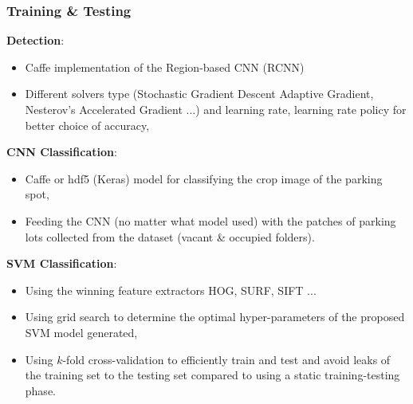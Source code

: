 \documentclass{beamer}
\begin{document}
\begin{frame}[allowframebreaks]
\frametitle{Training \& Testing} 

\textbf{Detection}: 
\begin{itemize}
\item Caffe implementation of the Region-based CNN (RCNN) 
\item Different solvers type (Stochastic Gradient Descent Adaptive Gradient, Nesterov’s Accelerated Gradient ...) and learning rate, learning rate policy for better choice of accuracy,
\end{itemize}
\textbf{CNN Classification}:
\begin{itemize}
	\item Caffe or hdf5 (Keras) model for classifying the crop image of the parking spot,
	\item Feeding the CNN (no matter what model used) with the patches of parking lots collected from the dataset (vacant \& occupied folders).
\end{itemize}
\textbf{SVM Classification}: 
\begin{itemize}
	\item Using the winning feature extractors HOG, SURF, SIFT ...
	\item Using grid search to determine the optimal hyper-parameters of the proposed SVM model generated,
	\item Using $k$-fold cross-validation to efficiently train and test and avoid leaks of the training set to the testing set compared to using a static training-testing phase.
\end{itemize} 

\end{frame}
\end{document}
